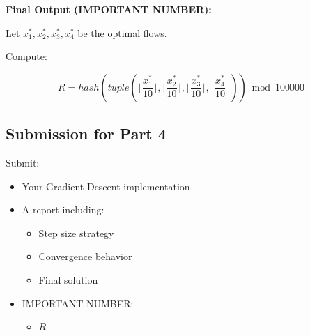 \documentclass{rapportCS} %
\begin{document}
\vspace{1cm}
\textbf{Final Output (IMPORTANT NUMBER):}

Let \( x_1^*, x_2^*, x_3^*, x_4^* \) be the optimal flows.

Compute:

$$ R = hash(tuple\left( \lfloor \frac{x_1^*}{10} \rfloor, \lfloor \frac{x_2^*}{10} \rfloor, \lfloor \frac{x_3^*}{10} \rfloor, \lfloor \frac{x_4^*}{10} \rfloor \right)) \bmod 100000 $$

\subsection{Submission for Part 4}

Submit:
\begin{itemize}
    \item Your Gradient Descent implementation
    \item A report including:
    \begin{itemize}
        \item Step size strategy
        \item Convergence behavior
        \item Final solution
    \end{itemize}
    \item IMPORTANT NUMBER:
    \begin{itemize}
        \item \( R \)
    \end{itemize}
\end{itemize}%
%
% 
\end{document}
